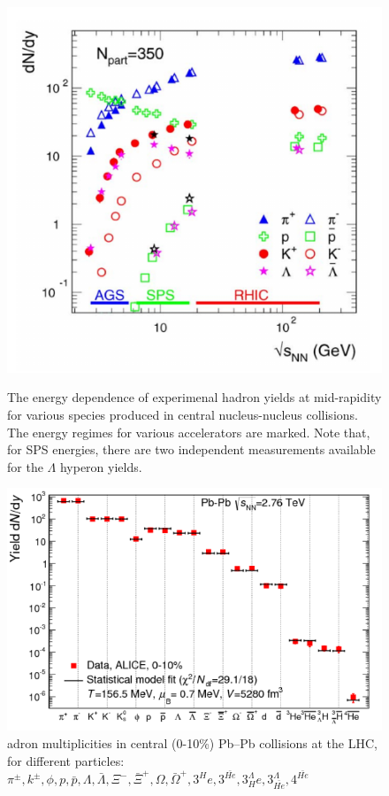 \documentclass[12pt,a4paper]{book}
\begin{document}
	\begin{figure}
		\centering
		\begin{minipage}{0.45\textwidth}
			\centering
			\includegraphics[width=0.8 \linewidth]{pictures/hadron_yelds.png}
			\caption{ The energy dependence of experimenal hadron yields at	mid-rapidity for various species produced in central nucleus-nucleus collisions. The energy regimes for various accelerators are marked. Note that, for SPS energies, there are two independent measurements available for the $\Lambda$ hyperon yields. \cite{Andronic_2006}}
			\label{fig:hadron_yelds}
		\end{minipage}
		\begin{minipage}{0.45\textwidth}
			\centering
			\includegraphics[width=0.7 \linewidth]{pictures/particle_abbundance.png}
			\caption{adron multiplicities in central (0-10\%) Pb–Pb collisions at the LHC, for different particles: $\pi^\pm, k^\pm, \phi, p, \bar{p}, \Lambda, \bar{\Lambda}, \Xi^-, \bar{\Xi}^+, \Omega, \bar{\Omega}^+, 3^He, 3^\bar{He}, 3^\Lambda_He, 3^\Lambda_\bar{He}, 4^\bar{He}$ \cite{Andronic_2017}}

\end{minipage}
\end{figure}
\end{document}
